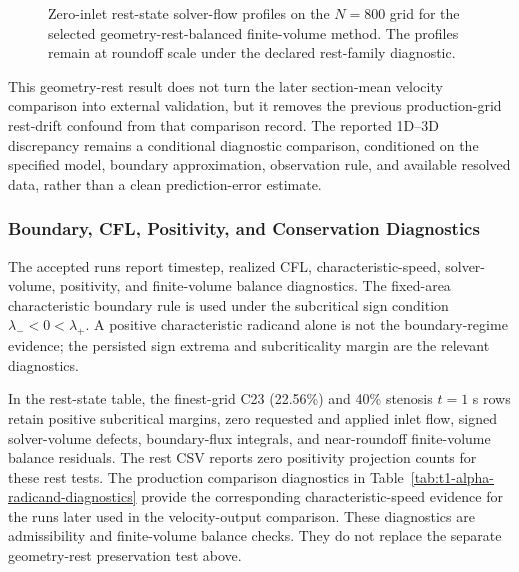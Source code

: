 \begin{table}[!htb]
    \centering
    \scriptsize
    \caption{Method-sensitivity check for the zero-inlet geometry-rest
    diagnostic at $N=400$. The final $\max |q|$ column reports the largest
    sampled solver-flow magnitude at the final requested diagnostic time,
    $t=0.1$ s, for executable rows. Values are solver-flow units cm$^3$/s
    except for the
    residual column, which reports the initial discrete flow residual
    magnitude.}
    \label{tab:rest-method-sensitivity}
    \resizebox{\textwidth}{!}{%
    
    }
\end{table}

\begin{figure}[!htb]
    \centering
    \caption{Zero-inlet rest-state solver-flow profiles on the $N=800$ grid for
    the selected geometry-rest-balanced finite-volume method. The profiles
    remain at roundoff scale under the declared rest-family diagnostic.}
    \label{fig:rest-state-flow-profiles}
\end{figure}

This geometry-rest result does not turn the later section-mean velocity
comparison into external validation, but it removes the previous production-grid
rest-drift confound from that comparison record. The reported 1D--3D
discrepancy remains a conditional diagnostic comparison, conditioned on the
specified model, boundary approximation, observation rule, and available
resolved data, rather than a clean prediction-error estimate.

\subsubsection{Boundary, CFL, Positivity, and Conservation Diagnostics}
\label{subsec:boundary-diagnostics}

The accepted runs report timestep, realized CFL, characteristic-speed,
solver-volume, positivity, and finite-volume balance diagnostics. The
fixed-area characteristic boundary rule is used under the subcritical sign
condition $\lambda_-<0<\lambda_+$. A positive characteristic radicand alone is
not the boundary-regime evidence; the persisted sign extrema and
subcriticality margin are the relevant diagnostics.

In the rest-state table, the finest-grid C23 (22.56\%) and 40\% stenosis
$t=1$ s rows retain positive subcritical margins, zero requested and applied
inlet flow, signed solver-volume defects, boundary-flux integrals, and
near-roundoff finite-volume balance residuals. The rest CSV reports zero
positivity projection counts for these rest tests. The production comparison
diagnostics in
Table~\ref{tab:t1-alpha-radicand-diagnostics} provide the corresponding
characteristic-speed evidence for the runs later used in the velocity-output
comparison. These diagnostics are admissibility and finite-volume balance
checks. They do not replace the separate geometry-rest preservation test above.

